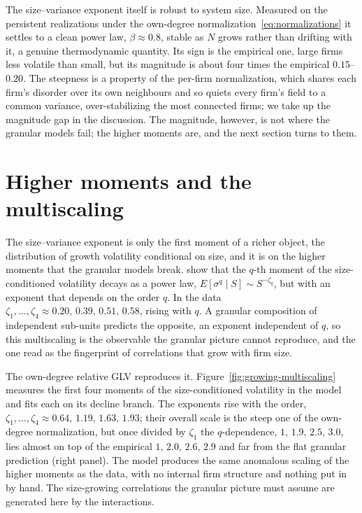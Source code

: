 The size--variance exponent itself is robust to system size. Measured on the persistent
realizations under the own-degree normalization~\eqref{eq:normalizations} it settles to a
clean power law, $\beta \approx 0.8$, stable as $N$ grows rather than drifting with it, a
genuine thermodynamic quantity. Its sign is the empirical one, large firms less volatile
than small, but its magnitude is about four times the empirical $0.15$--$0.20$. The
steepness is a property of the per-firm normalization, which shares each firm's disorder
over its own neighbours and so quiets every firm's field to a common variance,
over-stabilizing the most connected firms; we take up the magnitude gap in the discussion.
The magnitude, however, is not where the granular models fail; the higher moments are, and the
next section turns to them.

\section{Higher moments and the multiscaling}
\label{sec:growing-multiscaling}

The size--variance exponent is only the first moment of a richer object, the distribution
of growth volatility conditional on size, and it is on the higher moments that the
granular models break. \citet{moran2024} show that the $q$-th moment of the
size-conditioned volatility decays as a power law, $E[\sigma^q \mid S] \sim S^{-\zeta_q}$,
but with an exponent that depends on the order $q$. In the data
$\zeta_1,\dots,\zeta_4 \approx 0.20,\,0.39,\,0.51,\,0.58$, rising with $q$. A granular
composition of independent sub-units predicts the opposite, an exponent independent of
$q$, so this multiscaling is the observable the granular picture cannot reproduce, and the
one \citet{moran2024} read as the fingerprint of correlations that grow with firm size.

The own-degree relative GLV reproduces it. Figure~\ref{fig:growing-multiscaling} measures
the first four moments of the size-conditioned volatility in the model and fits each on
its decline branch. The exponents rise with the order,
$\zeta_1,\dots,\zeta_4 \approx 0.64,\,1.19,\,1.63,\,1.93$; their overall scale is the
steep one of the own-degree normalization, but once divided by $\zeta_1$ the
$q$-dependence, $1,\,1.9,\,2.5,\,3.0$, lies almost on top of the empirical
$1,\,2.0,\,2.6,\,2.9$ and far from the flat granular prediction (right panel). The model
produces the same anomalous scaling of the higher moments as the data, with no internal
firm structure and nothing put in by hand. The size-growing correlations the granular
picture must assume are generated here by the interactions.

